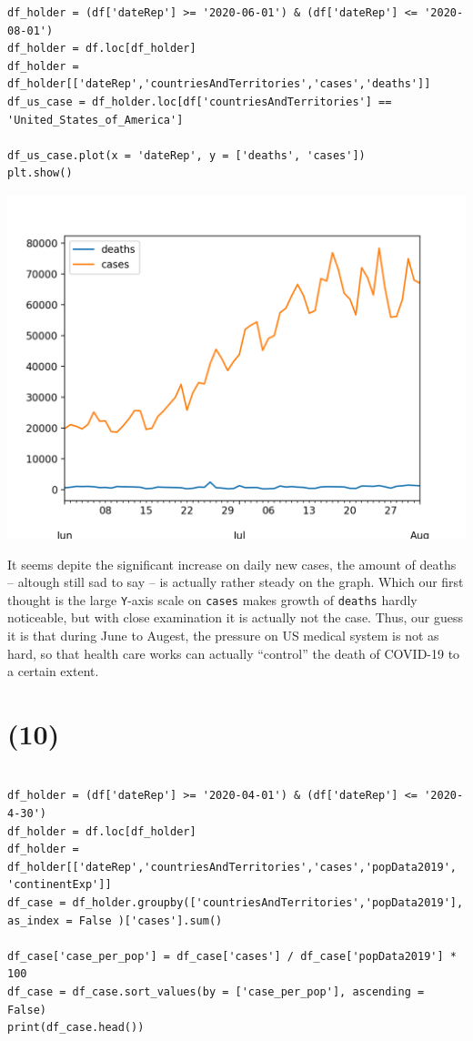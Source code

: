 \documentclass[12pt]{article}
\newcommand{\ilc}{\texttt}
\begin{document}
\begin{lstlisting}
df_holder = (df['dateRep'] >= '2020-06-01') & (df['dateRep'] <= '2020-08-01')
df_holder = df.loc[df_holder]
df_holder = df_holder[['dateRep','countriesAndTerritories','cases','deaths']]
df_us_case = df_holder.loc[df['countriesAndTerritories'] == 'United_States_of_America']

df_us_case.plot(x = 'dateRep', y = ['deaths', 'cases'])
plt.show()
\end{lstlisting}

\begin{center}
    \includegraphics[scale=0.8]{fig/p9.png}
\end{center}

It seems depite the significant increase on daily new cases, the amount of deaths -- altough still sad to say -- is actually rather steady on the graph. Which our first thought is the large \ilc{Y}-axis scale on \ilc{cases} makes growth of \ilc{deaths} hardly noticeable, but with close examination it is actually not the case. Thus, our guess it is that during June to Augest, the pressure on US medical system is not as hard, so that health care works can actually ``control'' the death of COVID-19 to a certain extent.

\section*{(10)}

\begin{lstlisting}

df_holder = (df['dateRep'] >= '2020-04-01') & (df['dateRep'] <= '2020-4-30')
df_holder = df.loc[df_holder]
df_holder = df_holder[['dateRep','countriesAndTerritories','cases','popData2019', 'continentExp']]
df_case = df_holder.groupby(['countriesAndTerritories','popData2019'], as_index = False )['cases'].sum()

df_case['case_per_pop'] = df_case['cases'] / df_case['popData2019'] * 100
df_case = df_case.sort_values(by = ['case_per_pop'], ascending = False)
print(df_case.head())
\end{lstlisting}
\end{document}

